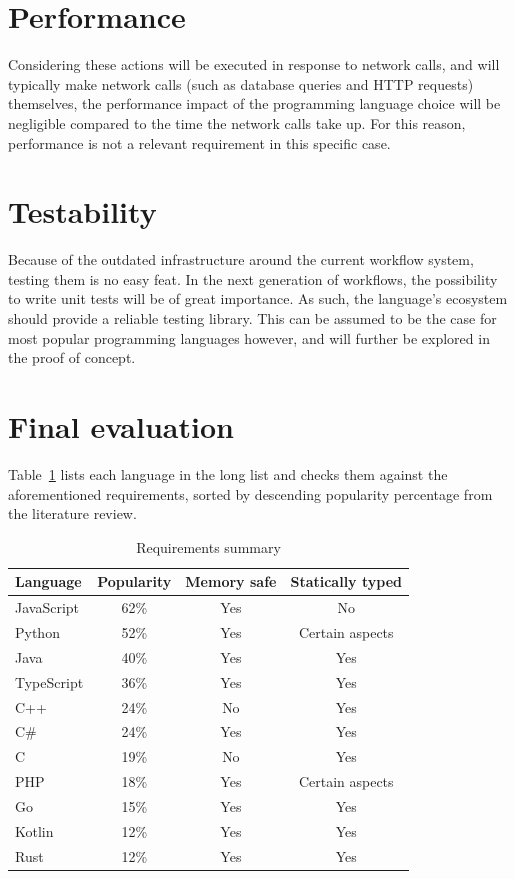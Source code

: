 \section{Performance}
Considering these actions will be executed in response to network calls, and will typically make network calls (such as database queries and HTTP requests) themselves, the performance impact of the programming language choice will be negligible compared to the time the network calls take up. For this reason, performance is not a relevant requirement in this specific case.

\section{Testability}
Because of the outdated infrastructure around the current workflow system, testing them is no easy feat. In the next generation of workflows, the possibility to write unit tests will be of great importance. As such, the language's ecosystem should provide a reliable testing library. This can be assumed to be the case for most popular programming languages however, and will further be explored in the proof of concept. 

\section{Final evaluation}
Table~\ref{tab:requirements-summary} lists each language in the long list and checks them against the aforementioned requirements, sorted by descending popularity percentage from the literature review.
\begin{table}[H]
\centering
\begin{tabular}{|l| c c c |}
    \hline
    Language & Popularity & Memory safe & Statically typed \\
    \hline
    JavaScript & 62\% & Yes & No \\
    Python     & 52\% & Yes & Certain aspects \\
    Java       & 40\% & Yes & Yes \\
    TypeScript & 36\% & Yes & Yes \\
    C++        & 24\% & No  & Yes \\
    C\#        & 24\% & Yes & Yes \\
    C          & 19\% & No  & Yes \\
    PHP        & 18\% & Yes & Certain aspects \\
    Go         & 15\% & Yes & Yes \\
    Kotlin     & 12\% & Yes & Yes \\
    Rust       & 12\% & Yes & Yes \\
    \hline
\end{tabular}
\caption{\label{tab:requirements-summary} Requirements summary}
\end{table}

